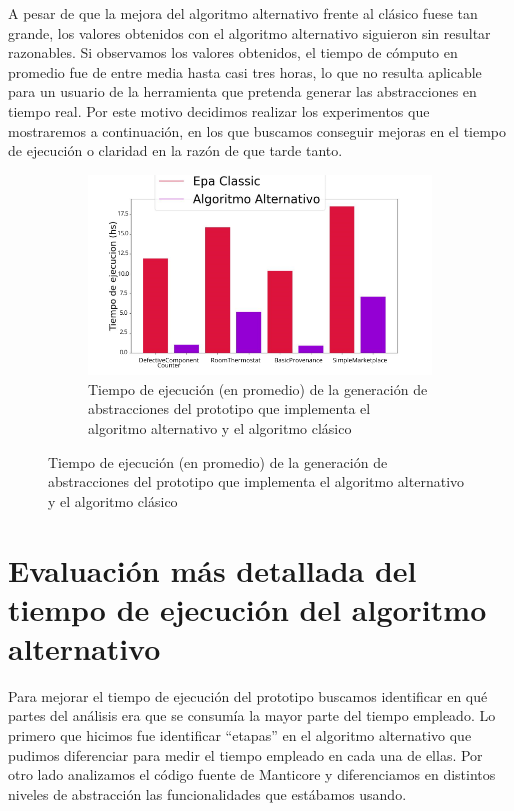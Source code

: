 A pesar de que la mejora del algoritmo alternativo frente al clásico fuese tan grande, los valores obtenidos con el algoritmo alternativo siguieron sin resultar razonables.
Si observamos los valores obtenidos, el tiempo de cómputo en promedio fue de entre media hasta casi tres horas, lo que no resulta aplicable para un usuario de la herramienta que pretenda generar las abstracciones en tiempo real.
Por este motivo decidimos realizar los experimentos que mostraremos a continuación, en los que buscamos conseguir mejoras en el tiempo de ejecución o claridad en la razón de que tarde tanto.

\begin{figure}
    \centering
    \begin{subfigure}{0.65\textwidth}
        \includegraphics[width=\textwidth]{figs/classic_vs_alternativo.png}
        \caption{Tiempo de ejecución (en promedio) de la generación de abstracciones del prototipo que implementa el algoritmo alternativo y el algoritmo clásico}
        \label{fig:classic-vs-alternativo}
    \end{subfigure}
\end{figure}

\section{Evaluación más detallada del tiempo de ejecución del algoritmo alternativo}
Para mejorar el tiempo de ejecución del prototipo buscamos identificar en qué partes del análisis era que se consumía la mayor parte del tiempo empleado.
Lo primero que hicimos fue identificar ``etapas'' en el algoritmo alternativo que pudimos diferenciar para medir el tiempo empleado en cada una de ellas.
Por otro lado analizamos el código fuente de Manticore y diferenciamos en distintos niveles de abstracción las funcionalidades que estábamos usando.

